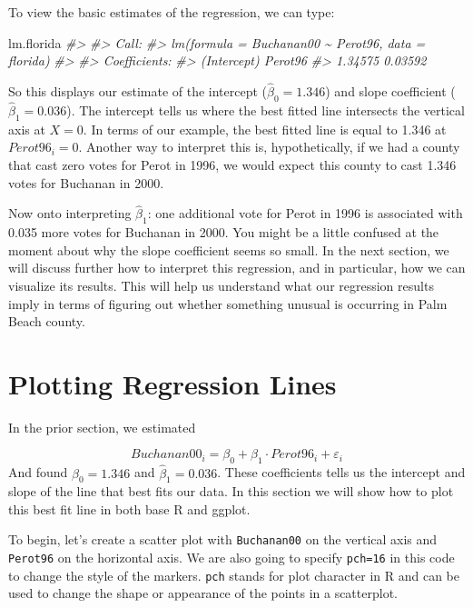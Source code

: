 \documentclass[
]{book}
\newenvironment{Shaded}{\begin{snugshade}}{\end{snugshade}}
\newcommand{\CommentTok}[1]{\textcolor[rgb]{0.56,0.35,0.01}{\textit{#1}}}
\newcommand{\NormalTok}[1]{#1}
\begin{document}
To view the basic estimates of the regression, we can type:

\begin{Shaded}
\begin{Highlighting}[]
\NormalTok{lm.florida}
\CommentTok{\#\textgreater{} }
\CommentTok{\#\textgreater{} Call:}
\CommentTok{\#\textgreater{} lm(formula = Buchanan00 \textasciitilde{} Perot96, data = florida)}
\CommentTok{\#\textgreater{} }
\CommentTok{\#\textgreater{} Coefficients:}
\CommentTok{\#\textgreater{} (Intercept)      Perot96  }
\CommentTok{\#\textgreater{}     1.34575      0.03592}
\end{Highlighting}
\end{Shaded}

So this displays our estimate of the intercept (\(\hat{\beta}_0=1.346\)) and slope coefficient (\(\hat{\beta}_1=0.036\)). The intercept tells us where the best fitted line intersects the vertical axis at \(X=0\). In terms of our example, the best fitted line is equal to 1.346 at \(Perot96_i=0\). Another way to interpret this is, hypothetically, if we had a county that cast zero votes for Perot in 1996, we would expect this county to cast 1.346 votes for Buchanan in 2000.

Now onto interpreting \(\hat{\beta}_1\): one additional vote for Perot in 1996 is associated with 0.035 more votes for Buchanan in 2000. You might be a little confused at the moment about why the slope coefficient seems so small. In the next section, we will discuss further how to interpret this regression, and in particular, how we can visualize its results. This will help us understand what our regression results imply in terms of figuring out whether something unusual is occurring in Palm Beach county.

\section{Plotting Regression Lines}\label{plotting-regression-lines}

In the prior section, we estimated

\[
Buchanan00_i = \beta_0 + \beta_1 \cdot Perot96_i + \varepsilon_i
\]
And found \(\hat{\beta}_0=1.346\) and \(\hat{\beta}_1=0.036\). These coefficients tells us the intercept and slope of the line that best fits our data. In this section we will show how to plot this best fit line in both base R and ggplot.

To begin, let's create a scatter plot with \texttt{Buchanan00} on the vertical axis and \texttt{Perot96} on the horizontal axis. We are also going to specify \texttt{pch=16} in this code to change the style of the markers. \texttt{pch} stands for plot character in R and can be used to change the shape or appearance of the points in a scatterplot.
\end{document}
